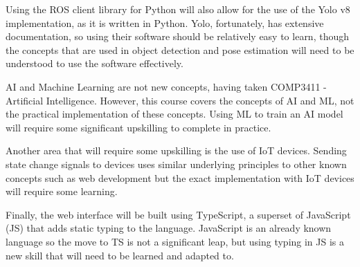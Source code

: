 Using the ROS client library for Python will also allow for the use of the Yolo v8 implementation, as it is written in Python.
Yolo, fortunately, has extensive documentation, so using their software should be relatively easy to learn, though the concepts that are used in object detection and pose estimation will need to be understood to use the software effectively.

AI and Machine Learning are not new concepts, having taken COMP3411 - Artificial Intelligence.
However, this course covers the concepts of AI and ML, not the practical implementation of these concepts.
Using ML to train an AI model will require some significant upskilling to complete in practice.

Another area that will require some upskilling is the use of IoT devices.
Sending state change signals to devices uses similar underlying principles to other known concepts such as web development but the exact implementation with IoT devices will require some learning.

Finally, the web interface will be built using TypeScript, a superset of JavaScript (JS) that adds static typing to the language.
JavaScript is an already known language so the move to TS is not a significant leap, but using typing in JS is a new skill that will need to be learned and adapted to.